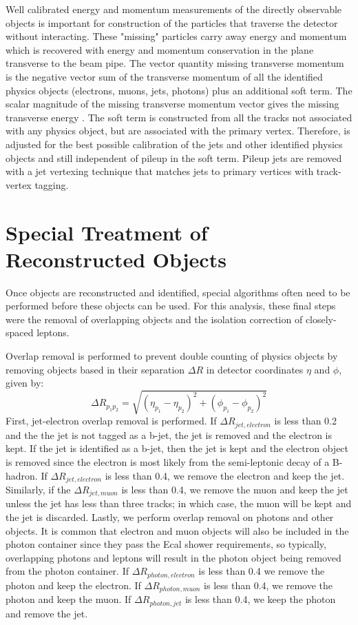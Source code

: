 Well calibrated energy and momentum measurements of the directly observable objects is important for construction of the particles that traverse the detector without interacting.  These "missing" particles carry away energy and momentum which is recovered with energy and momentum conservation in the plane transverse to the beam pipe.  The vector quantity missing transverse momentum \pt{} is the negative vector sum of the transverse momentum of all the identified physics objects (electrons, muons, jets, photons) plus an additional soft term.  The scalar magnitude of the missing transverse momentum vector gives the missing transverse energy \met. The soft term is constructed from all the tracks not associated with any physics object, but are associated with the primary vertex.  Therefore, \met{} is adjusted for the best possible calibration of the jets and other identified physics objects and still independent of pileup in the soft term.  Pileup jets are removed with a jet vertexing technique that matches jets to primary vertices with track-vertex tagging.


\section{Special Treatment of Reconstructed Objects}
\label{sec:obj:treat}
Once objects are reconstructed and identified, special algorithms often need to be performed before these objects can be used.  For this analysis, these final steps were the removal of overlapping objects and the isolation correction of closely-spaced leptons.

Overlap removal is performed to prevent double counting of physics objects by removing objects based in their separation $\Delta R$ in detector coordinates $\eta$ and $\phi$, given by:
\begin{equation}
\Delta R_{p_1p_2} = \sqrt{(\eta_{p_1}-\eta_{p_2})^2+(\phi_{p_1}-\phi_{p_2})^2}
\end{equation} 
First, jet-electron overlap removal is performed.  If $\Delta R_{jet, electron}$ is less than 0.2 and the the jet is not tagged as a b-jet, the jet is removed and the electron is kept.  If the jet is identified as a b-jet, then the jet is kept and the electron object is removed since the electron is most likely from the semi-leptonic decay of a B-hadron.  If $\Delta R_{jet, electron}$ is less than 0.4, we remove the electron and keep the jet.  Similarly, if the $\Delta R_{jet, muon}$ is less than 0.4, we remove the muon and keep the jet unless the jet has less than three tracks; in which case, the muon will be kept and the jet is discarded.  Lastly, we perform overlap removal on photons and other objects.  It is common that electron and muon objects will also be included in the photon container since they pass the Ecal shower requirements, so typically, overlapping photons and leptons will result in the photon object being removed from the photon container.  If $\Delta R_{photon, electron}$ is less than 0.4 we remove the photon and keep the electron.  If $\Delta R_{photon, muon}$ is less than 0.4, we remove the photon and keep the muon.  If $\Delta R_{photon, jet}$ is less than 0.4, we keep the photon and remove the jet.  


